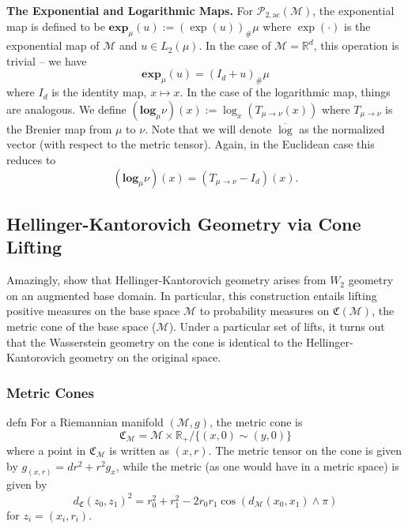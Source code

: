 \documentclass{article}
\newcommand{\man}{\mathcal{M}}
\begin{document}
\noindent \textbf{The Exponential and Logarithmic Maps.} For $\mathcal{P}_{2, \text{ac}}(\man)$, the exponential map is defined to be $\mathbf{exp}_{\mu}(u) := (\exp(u))_\#\mu$ where $\exp(\cdot)$ is the exponential map of $\man$ and $u \in L_2(\mu)$. In the case of $\man = \mathbb{R}^d$, this operation is trivial -- we have
\begin{equation}\label{eq: wasserstein euclidean expmap}
    \mathbf{exp}_\mu(u) = (I_d + u)_\# \mu
\end{equation}
where $I_d$ is the identity map, $x \mapsto x$. In the case of the logarithmic map, things are analogous. We define $(\mathbf{log}_\mu\nu) (x) := \log_x(T_{\mu \rightarrow \nu}(x))$ where $T_{\mu \rightarrow \nu}$ is the Brenier map from $\mu$ to $\nu$. Note that we will denote $\overline{\log}$ as the normalized vector (with respect to the metric tensor). Again, in the Euclidean case this reduces to
\begin{equation}\label{eq: wasserstein euclidean logmap}
    (\mathbf{log}_\mu\nu )(x) = (T_{\mu \rightarrow \nu} - I_d)(x).
\end{equation}


\subsection{Hellinger-Kantorovich Geometry via Cone Lifting}

Amazingly, \citet{liero2016optimal} show that Hellinger-Kantorovich geometry arises from $W_2$ geometry on an augmented base domain. In particular, this construction entails lifting positive measures on the base space $\man$ to probability measures on $\mathfrak{C}(\man)$, the metric cone of the base space ($\man$). Under a particular set of lifts, it turns out that the Wasserstein geometry on the cone is identical to the Hellinger-Kantorovich geometry on the original space.

\subsubsection{Metric Cones}

\begin{restatable}{defn}{} \label{def: metric cone}
    For a Riemannian manifold $(\man, g)$, the metric cone is
    \[\mathfrak{C}_\man = \man \times \mathbb{R}_{+} / \{(x, 0) \sim (y, 0)\}\]
    where a point in $\mathfrak{C}_\man$ is written as $(x, r)$. The metric tensor on the cone is given by $g_{(x,r)} = dr^2 + r^2g_x$, while the metric (as one would have in a metric space) is given by 
    \begin{equation*}
    d_{\mathfrak{C}}(z_0, z_1)^2 = r_0^2 + r_1^2 - 2r_0r_1\cos(d_{\man}(x_0, x_1) \land \pi)
    \end{equation*}
    for $z_i = (x_i, r_i)$.
\end{restatable} 
\end{document}

